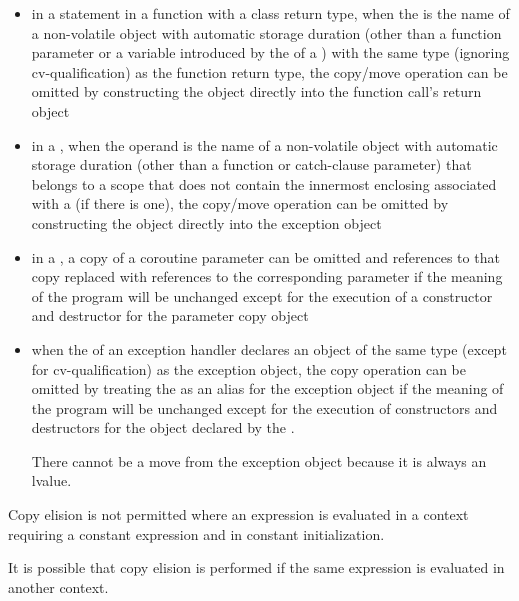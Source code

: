 \begin{itemize}
\item in a  statement in a function with a class return type,
when the  is the name of a non-volatile
object with automatic storage duration (other than a function parameter or a variable
introduced by the  of a
)
with the same type (ignoring cv-qualification) as
the function return type, the copy/move operation can be
omitted by constructing the object directly
into the function call's return object

\item in a , when the operand
is the name of a non-volatile object with automatic storage duration
(other than a function or catch-clause parameter)
that belongs to a scope that does not contain
the innermost enclosing 
associated with a  (if there is one),
the copy/move operation can be omitted by
constructing the object directly into the exception object

\item in a , a copy of a coroutine parameter
can be omitted and references to that copy replaced with references to the
corresponding parameter if the meaning of the program will be unchanged except for
the execution of a constructor and destructor for the parameter copy object

\item when the  of an
exception handler declares an object of the same
type (except for cv-qualification) as the exception
object, the copy operation can be omitted by treating
the  as an alias for the exception
object if the meaning of the program will be unchanged except for the execution
of constructors and destructors for the object declared by the
.
\begin{note}
There cannot be a move from the exception object because it is
always an lvalue.
\end{note}
\end{itemize}
Copy elision is not permitted
where an expression is evaluated in a context
requiring a constant expression
and in constant initialization.
\begin{note}
It is possible that copy elision is performed
if the same expression
is evaluated in another context.
\end{note}

